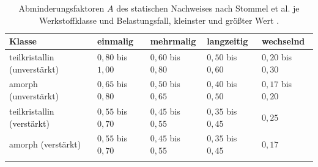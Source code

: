 \begin{table}[htbp]
    \caption{Abminderungsfaktoren $A$ des statischen Nachweises nach Stommel et al. je Werkstoffklasse und Belastungsfall, kleinster und größter Wert \cite[Bild 6.18, S.~346]{Sto18}.}
    \label{tab:anhang_klassen_abminderung}
    \centering
    \footnotesize
    \setlength{\tabcolsep}{4pt}
    \begin{tabular}{L{3.6cm}L{2.4cm}L{2.4cm}L{2.4cm}L{2.4cm}}
        Klasse & einmalig & mehrmalig & langzeitig & wechselnd \\
        \hline
        teilkristallin (unverstärkt) & $0{,}80$ bis $1{,}00$ & $0{,}60$ bis $0{,}80$ & $0{,}50$ bis $0{,}60$ & $0{,}20$ bis $0{,}30$ \\
        \hline
        amorph (unverstärkt) & $0{,}65$ bis $0{,}80$ & $0{,}50$ bis $0{,}65$ & $0{,}40$ bis $0{,}50$ & $0{,}17$ bis $0{,}20$ \\
        \hline
        teilkristallin (verstärkt) & $0{,}55$ bis $0{,}70$ & $0{,}45$ bis $0{,}55$ & $0{,}35$ bis $0{,}45$ & $0{,}25$ \\
        \hline
        amorph (verstärkt) & $0{,}55$ bis $0{,}70$ & $0{,}45$ bis $0{,}55$ & $0{,}35$ bis $0{,}45$ & $0{,}17$ \\
        \hline
    \end{tabular}
\end{table}
